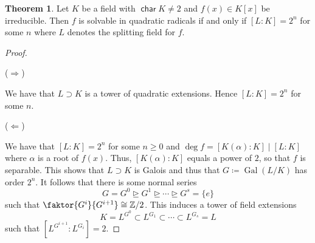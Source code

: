 \documentclass[10pt,letterpaper,cm]{nupset}
\theoremstyle{definition}
\theoremstyle{theorem}
\newtheorem{theorem}[definition]{Theorem}
\theoremstyle{remark}
\newcommand{\Z}{\mathbb Z}
\newcommand{\1}{\mathbf{1}}
\newcommand{\0}{\vec 0}
\DeclareMathOperator{\Char}{\mathsf{char}}
\DeclareMathOperator{\gal}{Gal}
\begin{document}
\begin{theorem}\label{solv}
Let $K$ be a field with $\Char{K} \ne 2$ and $f(x) \in K[x]$ be irreducible. Then $f$ is solvable in quadratic radicals if and only if $[L:K] =2^n$ for some $n$ where $L$ denotes the splitting field for $f$.
\end{theorem}
\begin{proof} $ $

($\Longrightarrow$) 

We have that $L \supset K$ is a tower of quadratic extensions. Hence  $[L:K] = 2^n$ for some $n$. 

\medskip


($\Longleftarrow$)  

We have that $[L:K] = 2^n$ for some $n\geq 0$ and $\deg{f} = [K(\alpha): K] \mid [L: K]$ where $\alpha$ is a root of $f(x)$. Thus, $[K(\alpha): K]$ equals a power of $2$, so that $f$ is separable. This shows that $L \supset K$ is Galois and thus that $G\coloneqq  \gal(L/K)$ has order $2^n$. It follows that there is some normal series $$ G =G^0 \unrhd G^1  \unrhd \cdots \unrhd G^s = \{e\}  $$ such that $\faktor{G^{i}}{G^{i+1}} \cong \Z/2$. This induces a tower of field  extensions $$ K= L^{G^0} \subset L^{G_1} \subset \cdots \subset L^{G_s} = L   $$ such that $[L^{G^{i+1}}: L^{G_i}] =2$.
\end{proof}

\smallskip
\end{document}
